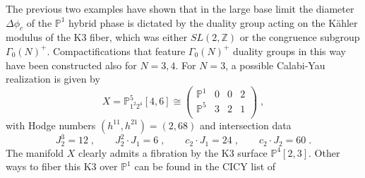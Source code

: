 \documentclass[11pt,a4paper]{article}
\numberwithin{equation}{section}
\numberwithin{table}{section}\setlength{\multlinegap}{25pt}
\begin{document}
The previous two examples have shown that in the large base limit the diameter $\Delta\phi_c$ of the $\mathbb{P}^1$ hybrid phase is dictated by the duality group acting on the Kähler modulus of the K3 fiber, which was either $SL(2,\mathbb{Z})$ or the congruence subgroup $\Gamma_0(N)^+$. Compactifications that feature $\Gamma_0(N)^+$ duality groups in this way have been constructed also for $N=3,4$. For $N=3$, a possible Calabi-Yau realization is given by~\cite{Klemm:1995tj}
\begin{equation}
    X=\mathbb{P}_{1^2 2^4}^5[4,6]\cong
    \left(
    \begin{array}{c|ccc}
        \mathbb{P}^1 & 0 & 0 & 2\\
        \mathbb{P}^5 & 3 & 2 & 1\\
    \end{array}
    \right)\;,
\end{equation}
with Hodge numbers $(h^{11},h^{21})=(2,68)$ and intersection data
\begin{equation}
    J_2^3=12\;,\qquad J_2^2\cdot J_1=6\;,\qquad c_2\cdot J_1=24\;,\qquad c_2\cdot J_2=60\;.
\end{equation}
The manifold $X$ clearly admits a fibration by the K3 surface $\mathbb{P}^4[2,3]$. Other ways to fiber this K3 over $\mathbb{P}^1$ can be found in the CICY list of~\cite{Anderson:2017aux}
\end{document}
